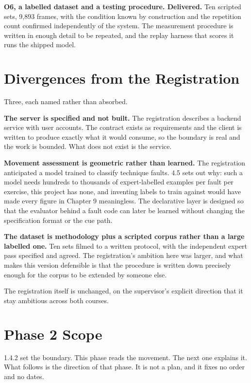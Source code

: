 \textbf{O6, a labelled dataset and a testing procedure. Delivered.} Ten scripted sets, 9,893 frames, with the condition known by construction and the repetition count confirmed independently of the system. The measurement procedure is written in enough detail to be repeated, and the replay harness that scores it runs the shipped model.

\section{Divergences from the Registration}
\label{sec:11.4}

Three, each named rather than absorbed.

\textbf{The server is specified and not built.} The registration describes a backend service with user accounts. The contract exists as requirements and the client is written to produce exactly what it would consume, so the boundary is real and the work is bounded. What does not exist is the service.

\textbf{Movement assessment is geometric rather than learned.} The registration anticipated a model trained to classify technique faults. 4.5 sets out why: such a model needs hundreds to thousands of expert-labelled examples per fault per exercise, this project has none, and inventing labels to train against would have made every figure in Chapter 9 meaningless. The declarative layer is designed so that the evaluator behind a fault code can later be learned without changing the specification format or the cue path.

\textbf{The dataset is methodology plus a scripted corpus rather than a large labelled one.} Ten sets filmed to a written protocol, with the independent expert pass specified and agreed. The registration's ambition here was larger, and what makes this version defensible is that the procedure is written down precisely enough for the corpus to be extended by someone else.

The registration itself is unchanged, on the supervisor's explicit direction that it stay ambitious across both courses.

\section{Phase 2 Scope}
\label{sec:11.5}

1.4.2 set the boundary. This phase reads the movement. The next one explains it. What follows is the direction of that phase. It is not a plan, and it fixes no order and no dates.

